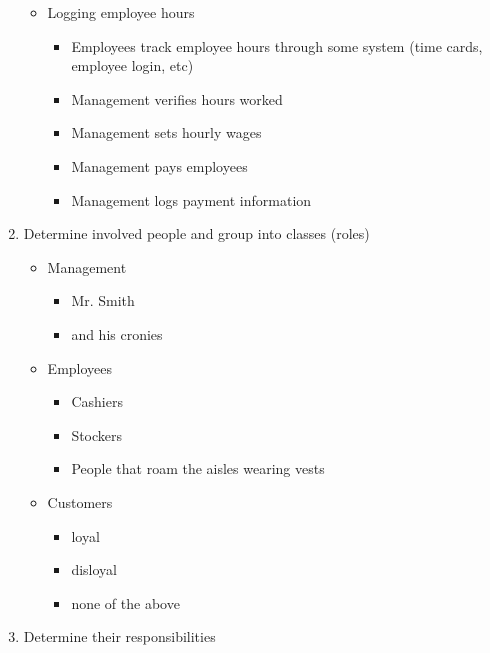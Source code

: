 \documentclass{letter}
\begin{document}
\begin{enumerate}
\begin{itemize}
\begin{itemize}
		\end{itemize}
		\item Logging employee hours
		\begin{itemize}
			\item Employees track employee hours through some system (time cards, employee login, etc)
			\item Management verifies hours worked
			\item Management sets hourly wages
			\item Management pays employees
			\item Management logs payment information
		\end{itemize}
	\end{itemize}
	
	\item Determine involved people and group into classes (roles)
		\begin{itemize}
			\item Management
				\begin{itemize}
					\item Mr. Smith
					\item and his cronies
				\end{itemize}
			\item Employees
				\begin{itemize}
					\item Cashiers
					\item Stockers
					\item People that roam the aisles wearing vests
				\end{itemize}
			\item Customers
				\begin{itemize}
					\item loyal
					\item disloyal
					\item none of the above
				\end{itemize}
		\end{itemize}
			
	\item Determine their responsibilities\\
	

\end{enumerate}
\end{document}
